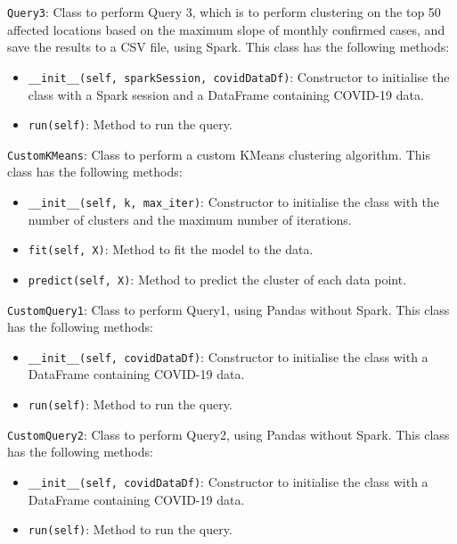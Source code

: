 \documentclass[12pt,oneside]{book} %
\begin{document}
\begin{description}
    \item \texttt{Query3}:
          Class to perform Query 3, which is to perform clustering on the top 50 affected locations based on the maximum slope of monthly confirmed cases, and save the results to a CSV file, using Spark. This class has the following methods:
          \begin{itemize}
              \item \texttt{\_\_init\_\_(self, sparkSession, covidDataDf)}: Constructor to initialise the class with a Spark session and a DataFrame containing COVID-19 data.
              \item \texttt{run(self)}: Method to run the query.
          \end{itemize}

    \item \texttt{CustomKMeans}:
          Class to perform a custom KMeans clustering algorithm. This class has the following methods:
          \begin{itemize}
              \item \texttt{\_\_init\_\_(self, k, max\_iter)}: Constructor to initialise the class with the number of clusters and the maximum number of iterations.
              \item \texttt{fit(self, X)}: Method to fit the model to the data.
              \item \texttt{predict(self, X)}: Method to predict the cluster of each data point.
          \end{itemize}

    \item \texttt{CustomQuery1}:
          Class to perform Query1, using Pandas without Spark. This class has the following methods:
          \begin{itemize}
              \item \texttt{\_\_init\_\_(self, covidDataDf)}: Constructor to initialise the class with a DataFrame containing COVID-19 data.
              \item \texttt{run(self)}: Method to run the query.
          \end{itemize}

    \item \texttt{CustomQuery2}:
          Class to perform Query2, using Pandas without Spark. This class has the following methods:
          \begin{itemize}
              \item \texttt{\_\_init\_\_(self, covidDataDf)}: Constructor to initialise the class with a DataFrame containing COVID-19 data.
              \item \texttt{run(self)}: Method to run the query.
          \end{itemize}
\end{description}
\end{document}

